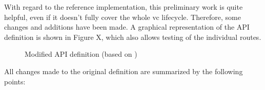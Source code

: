     With regard to the reference implementation, this preliminary work is quite helpful, even if it doesn't fully cover the whole \ac{vc} lifecycle. Therefore, some changes and additions have been made. A graphical representation of the API definition is shown in Figure X, which also allows testing of the individual routes.
    \newpage
    \begin{figure}[ht]
        \centering
        \caption{Modified API definition (based on \cite{world_wide_web_consortium_credentials_community_group_vc_2021})}
        \label{figure: api definition}
    \end{figure}
    
    All changes made to the original definition are summarized by the following points:
    
